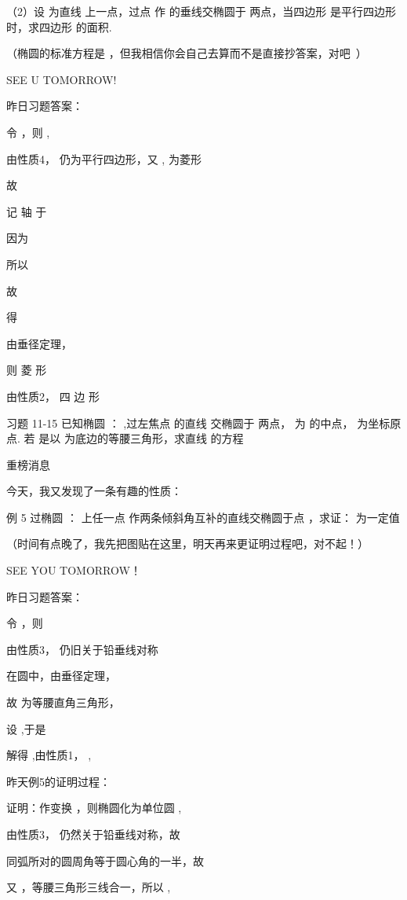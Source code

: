 （2）设  为直线  上一点，过点  作  的垂线交椭圆于  两点，当四边形  是平行四边形时，求四边形  的面积.



（椭圆的标准方程是  ，但我相信你会自己去算而不是直接抄答案，对吧~）



SEE U TOMORROW!



昨日习题答案：


令  ，则  , 

由性质4，  仍为平行四边形，又  ,  为菱形

故 

记 
轴
 于 

因为 

所以 

故 

得 

由垂径定理， 

则 
菱
形

由性质2， 
四
边
形



习题 11-15 已知椭圆 
：
 ,过左焦点  的直线  交椭圆于  两点，  为  的中点，  为坐标原点. 若  是以  为底边的等腰三角形，求直线  的方程



重榜消息

今天，我又发现了一条有趣的性质：

例 5 过椭圆 
：
 上任一点  作两条倾斜角互补的直线交椭圆于点  ，求证：  为一定值

（时间有点晚了，我先把图贴在这里，明天再来更证明过程吧，对不起！）




SEE YOU TOMORROW！

昨日习题答案：


令 ，则 

由性质3，  仍旧关于铅垂线对称

在圆中，由垂径定理， 

故  为等腰直角三角形， 

设  ,于是 

解得  ,由性质1，  , 



昨天例5的证明过程：


证明：作变换  ，则椭圆化为单位圆  , 

由性质3，  仍然关于铅垂线对称，故 

同弧所对的圆周角等于圆心角的一半，故 

又  ，等腰三角形三线合一，所以  , 

